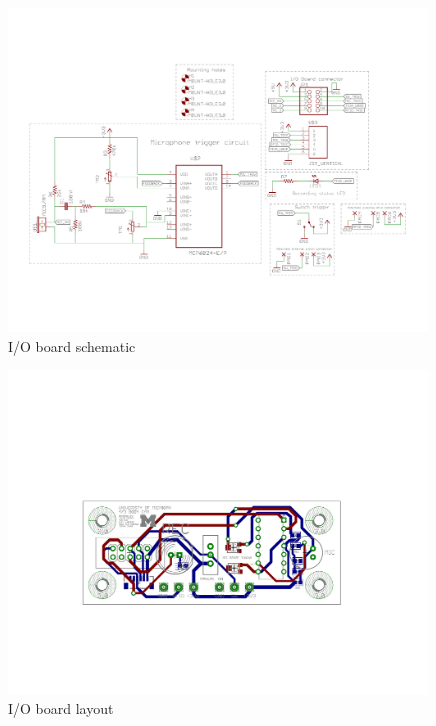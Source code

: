 \documentclass[12pt]{article}
\begin{document}
\begin{figure}[h]
    \centering
    \includegraphics[angle=-90,width=0.99\textwidth]{IOBoard_sch}
    \caption{I/O board schematic}
\end{figure}

\begin{figure}[h]
    \centering
    \includegraphics[angle=-90,width=0.99\textwidth]{IOBoard_brd}
    \caption{I/O board layout}
\end{figure}
\end{document}
